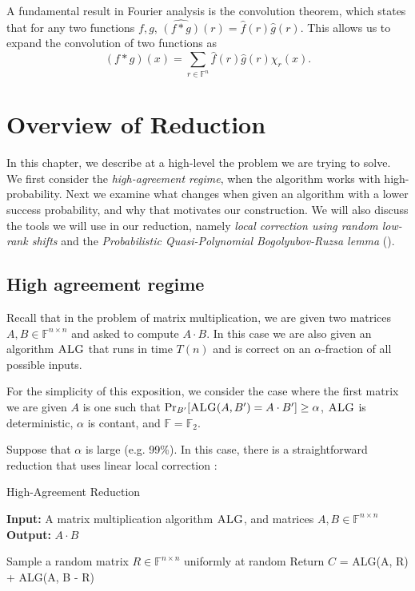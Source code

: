 \documentclass[12pt]{caltech_thesis}
\def\F{\mathbb{F}}
\begin{document}
A fundamental result in Fourier analysis is the convolution theorem, which states that for any two functions $f,g$, $\widehat{(f \ast g)}(r) = \widehat{f}(r)\widehat{g}(r)$. This allows us to expand the convolution of two functions as
\begin{equation*}
    (f \ast g)(x) = \sum_{r \in \F^n}\widehat{f}(r)\widehat{g}(r)\chi_{r}(x).
\end{equation*}

\chapter{Overview of Reduction}
\label{sec:overview}
In this chapter, we describe at a high-level the problem we are trying to solve. We first consider the \textit{high-agreement regime}, when the algorithm works with high-probability. Next we examine what changes when given an algorithm with a lower success probability, and why that motivates our construction. We will also discuss the tools we will use in our reduction, namely \textit{local correction using random low-rank shifts} and the \textit{Probabilistic Quasi-Polynomial Bogolyubov-Ruzsa lemma} (). 


\section{High agreement regime}
\label{sec:high}

Recall that in the problem of matrix multiplication, we are given two matrices $A,B \in \F^{n\times n}$ and asked to compute $A \cdot B$. In this case we are also given an algorithm $\textsc{ALG}$ that runs in time $T(n)$ and is correct on an $\alpha$-fraction of all possible inputs. 

For the simplicity of this exposition, we consider the case where the first matrix we are given $A$ is one such that $\Pr_{B'}[\textsc{ALG}(A, B') = A \cdot B'] \geq \alpha$, $\textsc{ALG}$ is deterministic, $\alpha$ is contant, and $\F = \F_2$. 

Suppose that $\alpha$ is large (e.g. 99\%).
In this case, there is a straightforward reduction that uses linear local correction \cite{BLUM1993549}:

\begin{algorithm}
\caption{High-Agreement Reduction}\label{alg:high}
\textbf{Input:} A matrix multiplication algorithm $\textsc{ALG}$, and matrices $A,B \in \F^{n \times n}$\\
\textbf{Output:} $A \cdot B$
\begin{algorithmic}[1]
\State Sample a random matrix $R \in \F^{n \times n}$ uniformly at random
\State Return $C$ = \textsc{ALG}(A, R) + \textsc{ALG}(A, B - R)
\end{algorithmic}
\end{algorithm}
\end{document}
